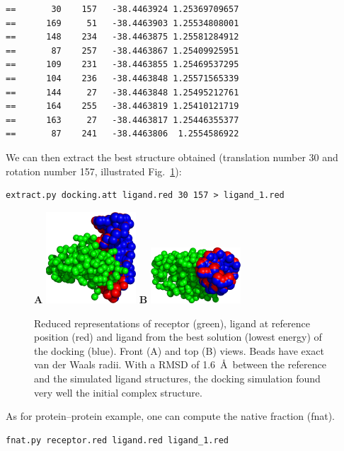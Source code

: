 \documentclass[12pt,a4paper]{article}
\begin{document}
\begin{verbatim}
==       30    157   -38.4463924 1.25369709657
==      169     51   -38.4463903 1.25534808001
==      148    234   -38.4463875 1.25581284912
==       87    257   -38.4463867 1.25409925951
==      109    231   -38.4463855 1.25469537295
==      104    236   -38.4463848 1.25571565339
==      144     27   -38.4463848 1.25495212761
==      164    255   -38.4463819 1.25410121719
==      163     27   -38.4463817 1.25446355377
==       87    241   -38.4463806  1.2554586922
\end{verbatim}


We can then extract the best structure obtained (translation number 30 
and rotation number 157, illustrated Fig.~\ref{1K79_dock}):

\begin{verbatim}
extract.py docking.att ligand.red 30 157 > ligand_1.red
\end{verbatim}

\begin{figure}[htbp]
\center
{\textbf A}
\includegraphics*[width=0.30\textwidth]{img/1K79_dock1_front.png}
\hspace*{2cm}
{\textbf B}
\includegraphics*[width=0.30\textwidth]{img/1K79_dock1_top.png}
\caption{Reduced representations of receptor (green), ligand at reference 
position (red) and ligand from the best solution (lowest energy) of the 
docking (blue). Front (A) and top (B) views. Beads have exact van der Waals 
radii. With a RMSD of 1.6~\AA\ between the reference and the simulated ligand 
structures, the docking simulation found very well the initial complex 
structure.}
\label{1K79_dock}
\end{figure}

As for protein--protein example, one can compute the native fraction (fnat).
\begin{verbatim}
fnat.py receptor.red ligand.red ligand_1.red
\end{verbatim}
\end{document}

